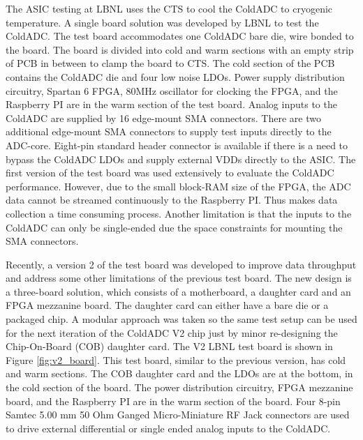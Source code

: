 \label{sec:2.4}
The ASIC testing at LBNL uses the CTS to cool the ColdADC to cryogenic temperature. A single board solution was 
developed by LBNL to test the ColdADC. The test board accommodates one ColdADC bare die, wire bonded to the board. 
The board is divided into cold and warm sections with an empty strip of PCB in between to clamp the board to CTS.
The cold section of the PCB contains the ColdADC die and four low noise LDOs.
Power supply distribution circuitry, Spartan 6 FPGA,  80MHz oscillator for clocking 
the FPGA, and the Raspberry PI are in the warm section of the test board. Analog inputs to 
the ColdADC are supplied by 16 edge-mount SMA connectors. There are two additional edge-mount SMA connectors 
to supply test inputs directly to the ADC-core. Eight-pin standard header connector is available if there is 
a need to bypass the ColdADC LDOs and supply external VDDs directly to the ASIC.
The first version of the test board was used extensively to evaluate the ColdADC performance.  However, due to the small 
block-RAM size of the FPGA, the ADC data cannot be streamed continuously to the Raspberry PI. Thus makes
data collection a time consuming process. Another limitation is that the inputs to the ColdADC can only be single-ended due 
the space constraints for mounting the SMA connectors.

Recently, a version 2 of the test board was developed to improve data throughput and address some other limitations 
of the previous test board.  The new design is a three-board 
solution, which consists of a motherboard, a daughter card and an FPGA mezzanine board. The daughter card can either have a 
bare die or a packaged chip. A modular approach was taken so the same test setup 
can be used for the next iteration of the ColdADC V2 chip just by minor re-designing the Chip-On-Board (COB) daughter card. The V2 LBNL 
test board is shown in Figure \ref{fig:v2_board}. This test board, similar to the previous version, has cold and warm 
sections. The COB daughter card and the LDOs are at the bottom, in the cold section of the board. The power 
distribution circuitry, FPGA mezzanine board, and the Raspberry PI are in the warm section of the board. 
Four 8-pin Samtec 5.00 mm 50 Ohm Ganged Micro-Miniature RF Jack connectors are used to drive external 
differential or single ended analog inputs to the ColdADC.  

